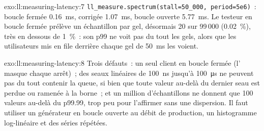 \begin{solution}{exo:ll:measuring-latency:7}
\texttt{ll\_measure.spectrum(stall=50\_000, period=5e6)}~: boucle fermée \qty{0.16}{\milli\second}, corrigée
\qty{1.07}{\milli\second}, boucle ouverte \qty{5.77}{\milli\second}. Le testeur en boucle fermée prélève un échantillon par gel, désormais
20 sur 99\,000 (0.02~\%), très en dessous de 1~\%~: son p99 ne voit pas du tout les gels, alors que les utilisateurs mis en file derrière chaque
gel de \qty{50}{\milli\second} les voient.
\end{solution}

\begin{solution}{exo:ll:measuring-latency:8}
Trois défauts~: un seul client en boucle fermée (l' masque chaque arrêt)~; des seaux linéaires de \qty{100}{\nano\second}
jusqu'à \qty{100}{\micro\second} ne peuvent pas du tout contenir la queue, si bien que toute valeur au-delà du dernier seau est perdue ou ramenée à la borne~; et
un million d'échantillons ne donnent que 100 valeurs au-delà du p99.99, trop peu pour l'affirmer sans une dispersion. Il faut utiliser un générateur en boucle ouverte au
débit de production, un histogramme log-linéaire et des séries répétées.
\end{solution}

